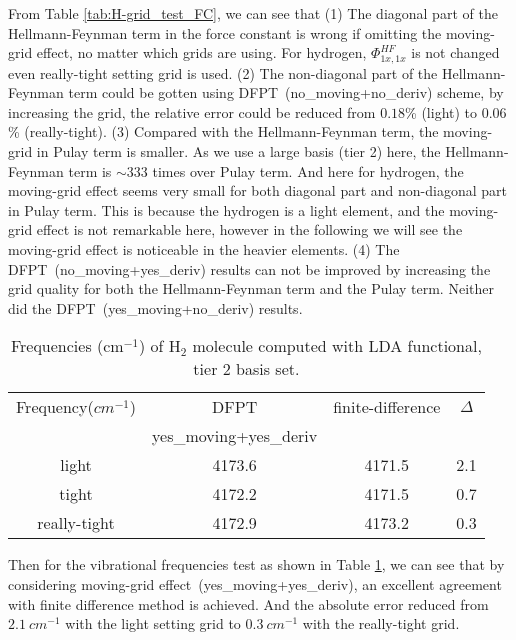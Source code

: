 \documentclass[journal=jpca,manuscript=article]{achemso}
\begin{document}
From Table \ref{tab:H-grid_test_FC}, we can see that 
(1) The diagonal part of the Hellmann-Feynman term in 
the force constant is wrong if omitting the moving-grid effect, no
matter which grids are using. For hydrogen, $\Phi^{HF}_{1x,1x}$ is not changed 
even really-tight setting grid is used. (2) The non-diagonal part of 
the Hellmann-Feynman term could be gotten using DFPT~(no\_moving+no\_deriv) scheme, by increasing the
grid, the relative error could be reduced from $0.18$\% (light) to  $0.06$\% (really-tight). (3) Compared with the Hellmann-Feynman term, the moving-grid in
Pulay term is smaller. As we use a large basis (tier 2) here, 
the Hellmann-Feynman term is $\sim 333$ times over Pulay term. And here for
hydrogen, the moving-grid effect seems very small for both diagonal part and
non-diagonal part in Pulay term. This is because the hydrogen is a light element,
and the moving-grid effect is not remarkable here, however in the following 
we will see the moving-grid effect is noticeable in the heavier elements.
(4) The DFPT~(no\_moving+yes\_deriv) results can not be
improved by increasing the grid quality for both the Hellmann-Feynman term and the Pulay term. Neither did the DFPT~(yes\_moving+no\_deriv) results. 

\begin{table}
\begin{tabular}{c | c c  c  }
\hline \hline
  Frequency($cm^{-1}$)  & DFPT & finite-difference  & $\Delta$ \\  
  &  yes\_moving+yes\_deriv &   &  \\  
\hline 
    light  & 4173.6  & 4171.5 & 2.1  \\  
    tight &  4172.2  & 4171.5 & 0.7 \\  
  really-tight & 4172.9 & 4173.2 & 0.3  \\  
\hline \hline 
\end{tabular}
\caption{Frequencies (cm$^{-1}$) of H$_2$ molecule computed with LDA functional, tier 2 basis set.}
\label{tab:H-grid_test_freq}
\end{table}

Then for the vibrational frequencies test as shown in Table \ref{tab:H-grid_test_freq}, we can see that by considering
moving-grid effect~(yes\_moving+yes\_deriv), an excellent agreement with finite difference method is achieved. And  the absolute error reduced from $2.1~cm^{-1}$ with the light setting grid to $0.3~cm^{-1}$ with the really-tight grid. 
\end{document}
